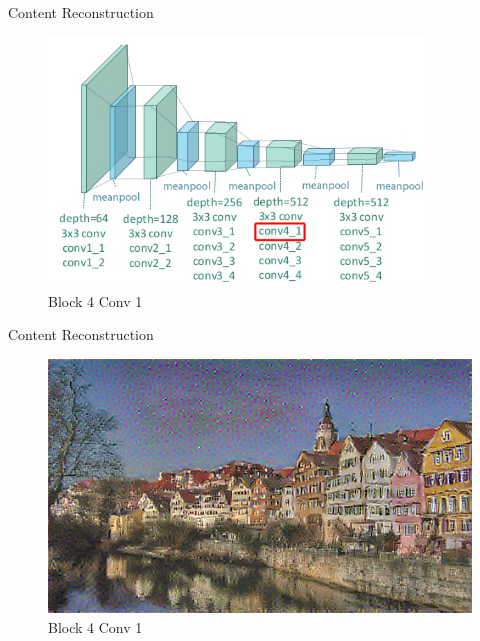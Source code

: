 \documentclass{beamer}
\begin{document}
\begin{frame}{Content Reconstruction}
\begin{figure}[ht]
\centering
\includegraphics[width=0.9\textwidth]{img/vgg19/content/block4_conv1}
\caption*{Block 4 Conv 1}
\end{figure}
\end{frame}
\begin{frame}{Content Reconstruction}
\begin{figure}[ht]
\centering
\includegraphics[width=\textwidth]{img/content/block4_conv1.png}
\caption*{Block 4 Conv 1}
\end{figure}
\end{frame}
\end{document}

